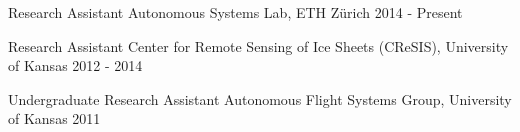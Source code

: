 

\begin{cventries}

  \cventry
    {Research Assistant} %
    {Autonomous Systems Lab, ETH Z\"{u}rich} %
    {} %
    {2014 - Present} %
    {
    }

  \cventry
    {Research Assistant} %
    {Center for Remote Sensing of Ice Sheets (CReSIS), University of Kansas} %
    {} %
    {2012 - 2014} %
    {
    }

  \cventry
    {Undergraduate Research Assistant} %
    {Autonomous Flight Systems Group, University of Kansas} %
    {} %
    {2011} %
    {
    }


\end{cventries}
